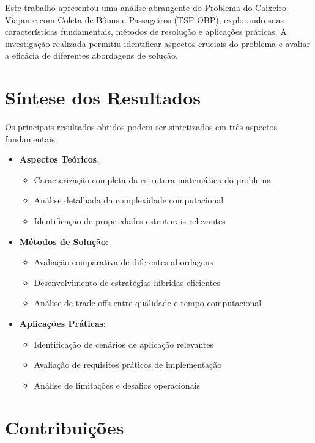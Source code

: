 \documentclass[12pt, a4paper]{report}
\begin{document}
Este trabalho apresentou uma análise abrangente do Problema do Caixeiro Viajante com Coleta de Bônus e Passageiros (TSP-OBP), explorando suas características fundamentais, métodos de resolução e aplicações práticas. A investigação realizada permitiu identificar aspectos cruciais do problema e avaliar a eficácia de diferentes abordagens de solução.

\section{Síntese dos Resultados}

Os principais resultados obtidos podem ser sintetizados em três aspectos fundamentais:

\begin{itemize}
    \item \textbf{Aspectos Teóricos}:
    \begin{itemize}
        \item Caracterização completa da estrutura matemática do problema
        \item Análise detalhada da complexidade computacional
        \item Identificação de propriedades estruturais relevantes
    \end{itemize}
    
    \item \textbf{Métodos de Solução}:
    \begin{itemize}
        \item Avaliação comparativa de diferentes abordagens
        \item Desenvolvimento de estratégias híbridas eficientes
        \item Análise de trade-offs entre qualidade e tempo computacional
    \end{itemize}
    
    \item \textbf{Aplicações Práticas}:
    \begin{itemize}
        \item Identificação de cenários de aplicação relevantes
        \item Avaliação de requisitos práticos de implementação
        \item Análise de limitações e desafios operacionais
    \end{itemize}
\end{itemize}

\section{Contribuições}
\end{document}
